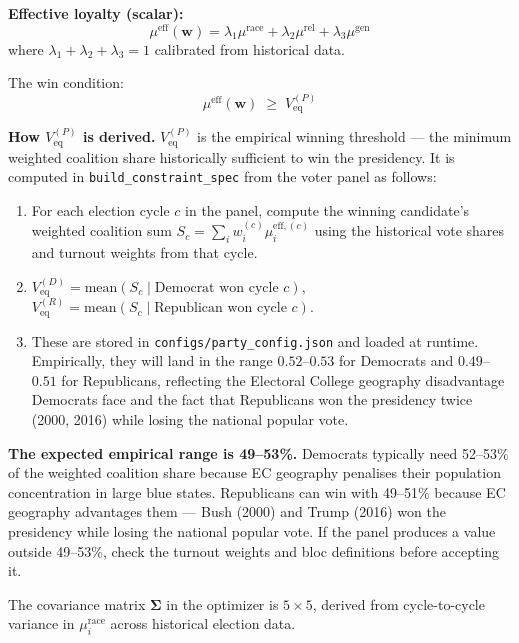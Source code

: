 \documentclass[11pt]{article}
\newcommand{\veq}{V_{\mathrm{eq}}}
\newcommand{\boldSigma}{\boldsymbol{\Sigma}}
\begin{document}
\textbf{Effective loyalty (scalar):}
\[
  \mu^{\text{eff}}(\mathbf{w}) = \lambda_1 \mu^{\text{race}} + \lambda_2 \mu^{\text{rel}}
  + \lambda_3 \mu^{\text{gen}}
\]
where $\lambda_1 + \lambda_2 + \lambda_3 = 1$ calibrated from historical data.

The win condition:
\[
  \mu^{\text{eff}}(\mathbf{w}) \;\geq\; \veq^{(P)}
\]

\textbf{How $\veq^{(P)}$ is derived.}
$\veq^{(P)}$ is the empirical winning threshold --- the minimum weighted coalition
share historically sufficient to win the presidency. It is computed in
\texttt{build\_constraint\_spec} from the voter panel as follows:

\begin{enumerate}[leftmargin=2em, itemsep=2pt]
  \item For each election cycle $c$ in the panel, compute the winning candidate's
        weighted coalition sum $S_c = \sum_i w_i^{(c)} \mu_i^{\text{eff},(c)}$
        using the historical vote shares and turnout weights from that cycle.
  \item $\veq^{(D)} = \text{mean}(S_c \mid \text{Democrat won cycle } c)$,
        $\veq^{(R)} = \text{mean}(S_c \mid \text{Republican won cycle } c)$.
  \item These are stored in \texttt{configs/party\_config.json} and loaded at
        runtime. Empirically, they will land in the range $0.52$--$0.53$ for
        Democrats and $0.49$--$0.51$ for Republicans, reflecting the Electoral
        College geography disadvantage Democrats face and the fact that
        Republicans won the presidency twice (2000, 2016) while losing the
        national popular vote.
\end{enumerate}

\begin{mdframed}[style=warnbox]
\textbf{The expected empirical range is 49--53\%.} Democrats typically need
52--53\% of the weighted coalition share because EC geography penalises
their population concentration in large blue states. Republicans can win
with 49--51\% because EC geography advantages them --- Bush (2000) and
Trump (2016) won the presidency while losing the national popular vote.
If the panel produces a value outside 49--53\%, check the turnout weights
and bloc definitions before accepting it.
\end{mdframed}

The covariance matrix $\boldSigma$ in the optimizer is $5 \times 5$, derived from
cycle-to-cycle variance in $\mu_i^{\text{race}}$ across historical election data.
\end{document}
